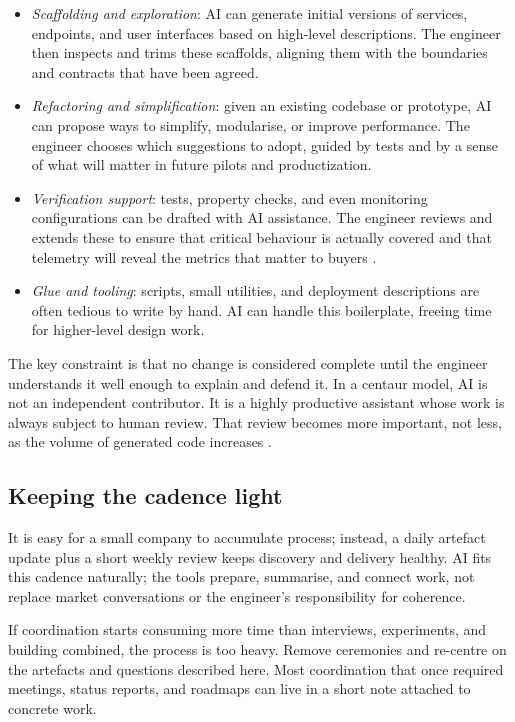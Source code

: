\documentclass[10pt, a4paper, twocolumn]{article} %
\begin{document}
\begin{itemize}
  \item \emph{Scaffolding and exploration}: AI can generate initial versions of services, endpoints, and user interfaces based on high-level descriptions. The engineer then inspects and trims these scaffolds, aligning them with the boundaries and contracts that have been agreed.
  \item \emph{Refactoring and simplification}: given an existing codebase or prototype, AI can propose ways to simplify, modularise, or improve performance. The engineer chooses which suggestions to adopt, guided by tests and by a sense of what will matter in future pilots and productization.
  \item \emph{Verification support}: tests, property checks, and even monitoring configurations can be drafted with AI assistance. The engineer reviews and extends these to ensure that critical behaviour is actually covered and that telemetry will reveal the metrics that matter to buyers \citep{forsgren2018accelerate}.
  \item \emph{Glue and tooling}: scripts, small utilities, and deployment descriptions are often tedious to write by hand. AI can handle this boilerplate, freeing time for higher-level design work.
\end{itemize}

The key constraint is that no change is considered complete until the engineer understands it well enough to explain and defend it. In a centaur model, AI is not an independent contributor. It is a highly productive assistant whose work is always subject to human review. That review becomes more important, not less, as the volume of generated code increases \citep{blomgren2025coordination}.

\subsection{Keeping the cadence light}

It is easy for a small company to accumulate process; instead, a daily artefact update plus a short weekly review keeps discovery and delivery healthy. AI fits this cadence naturally; the tools prepare, summarise, and connect work, not replace market conversations or the engineer’s responsibility for coherence.

If coordination starts consuming more time than interviews, experiments, and building combined, the process is too heavy. Remove ceremonies and re-centre on the artefacts and questions described here. Most coordination that once required meetings, status reports, and roadmaps can live in a short note attached to concrete work.
\end{document}
